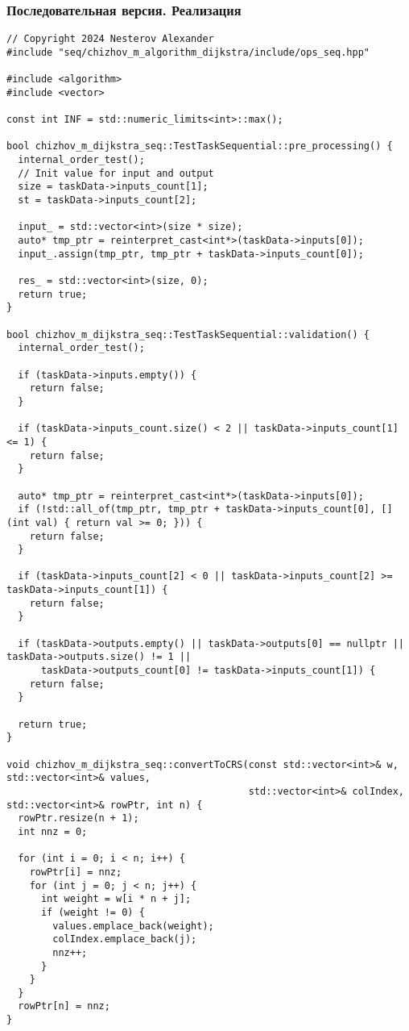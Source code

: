\documentclass[a4paper, 14pt]{extarticle}
\begin{document}
\subsubsection{Последовательная версия. Реализация}
\begin{lstlisting}
// Copyright 2024 Nesterov Alexander
#include "seq/chizhov_m_algorithm_dijkstra/include/ops_seq.hpp"

#include <algorithm>
#include <vector>

const int INF = std::numeric_limits<int>::max();

bool chizhov_m_dijkstra_seq::TestTaskSequential::pre_processing() {
  internal_order_test();
  // Init value for input and output
  size = taskData->inputs_count[1];
  st = taskData->inputs_count[2];

  input_ = std::vector<int>(size * size);
  auto* tmp_ptr = reinterpret_cast<int*>(taskData->inputs[0]);
  input_.assign(tmp_ptr, tmp_ptr + taskData->inputs_count[0]);

  res_ = std::vector<int>(size, 0);
  return true;
}

bool chizhov_m_dijkstra_seq::TestTaskSequential::validation() {
  internal_order_test();

  if (taskData->inputs.empty()) {
    return false;
  }

  if (taskData->inputs_count.size() < 2 || taskData->inputs_count[1] <= 1) {
    return false;
  }

  auto* tmp_ptr = reinterpret_cast<int*>(taskData->inputs[0]);
  if (!std::all_of(tmp_ptr, tmp_ptr + taskData->inputs_count[0], [](int val) { return val >= 0; })) {
    return false;
  }

  if (taskData->inputs_count[2] < 0 || taskData->inputs_count[2] >= taskData->inputs_count[1]) {
    return false;
  }

  if (taskData->outputs.empty() || taskData->outputs[0] == nullptr || taskData->outputs.size() != 1 ||
      taskData->outputs_count[0] != taskData->inputs_count[1]) {
    return false;
  }

  return true;
}

void chizhov_m_dijkstra_seq::convertToCRS(const std::vector<int>& w, std::vector<int>& values,
                                          std::vector<int>& colIndex, std::vector<int>& rowPtr, int n) {
  rowPtr.resize(n + 1);
  int nnz = 0;

  for (int i = 0; i < n; i++) {
    rowPtr[i] = nnz;
    for (int j = 0; j < n; j++) {
      int weight = w[i * n + j];
      if (weight != 0) {
        values.emplace_back(weight);
        colIndex.emplace_back(j);
        nnz++;
      }
    }
  }
  rowPtr[n] = nnz;
}


\end{lstlisting}
\end{document}
